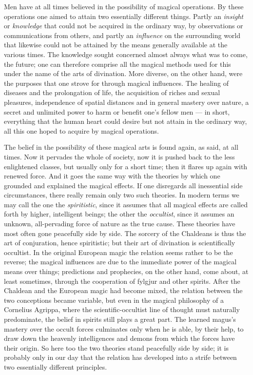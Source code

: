 \documentclass[12pt,a4paper,openany]{book}
\newcommand{\opage}[1]{\marginnote{\footnotesize\textit{[#1]}}}
\begin{document}
Men have at all times believed in the possibility of
magical operations. By these operations one aimed
to attain two essentially different things. Partly an \emph{insight}
or \emph{knowledge} that could not be acquired in the ordinary way,
by observations or communications from others, and partly an \emph{influence}
on the surrounding world that likewise could not be attained
by the means generally available at the various times.
The knowledge sought concerned almost always what was
to come, the future; one can therefore comprise all the
magical methods used for this under the name of the arts of divination.
More diverse, on the other hand, were the purposes
that one strove for through magical influences. The healing
of diseases and the prolongation of life, the acquisition of
riches and sexual pleasures, independence of spatial
distances and in general mastery over nature, a
secret and unlimited power to harm or benefit one's
fellow men --- in short, everything that the human heart could
desire but not attain in the ordinary way, all this one
hoped to acquire by magical operations.

The belief in the possibility of these magical arts is found again,
as said, at all times. Now it pervades the whole of society,
now it is pushed back to the less enlightened classes,
but usually only for a short time; then it flares up
again with renewed force. And it goes the same way with
the theories by which one grounded and explained the magical
effects. If one disregards all inessential side circumstances,
there really remain only two such theories.
In modern terms we may call the one the \emph{spiritistic},
since it assumes that all magical effects
are called forth by higher, intelligent beings; the other the
\emph{occultist}, since it assumes an unknown, all-pervading
\setcounter{footnote}{0}%
\opage{283}force of nature as the true cause. These theories
have most often gone peacefully side by side. The sorcery of the Chaldeans
is thus the art of conjuration, hence spiritistic; but
their art of divination is scientifically occultist. In the original
European magic the relation seems rather to be the
reverse; the magical influences are due to the immediate power of the magical means
over things; predictions and prophecies,
on the other hand, come about, at least sometimes, through
the cooperation of fylgjur and other spirits. After the Chaldean
and the European magic had become mixed, the relation
between the two conceptions became variable, but even in the magical
philosophy of a Cornelius Agrippa, where the scientific-occultist
line of thought must naturally predominate, the belief in spirits
still plays a great part. The learned magus's mastery
over the occult forces culminates only when he
is able, by their help, to draw down the heavenly intelligences
and demons from which the forces have their origin.
So here too the two theories stand peacefully side
by side; it is probably only in our day that the relation has
developed into a strife between two essentially different
principles.
\end{document}
